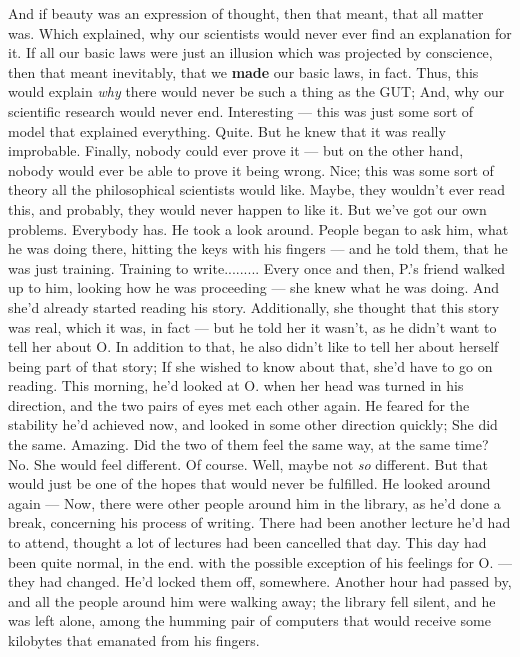 And if beauty was an expression of thought, then that meant, that all matter was. 
Which explained, why our scientists would never ever find an explanation for it. 
If all our basic laws were just an illusion which was projected by conscience, then that meant inevitably, that we \textbf{made} our basic laws, in fact. Thus, this would explain \emph{why} there would never be such a thing as the GUT; And, why our scientific research would never end. 
Interesting --- this was just some sort of model that explained everything. Quite. 
But he knew that it was really improbable. 
Finally, nobody could ever prove it --- but on the other hand, nobody would ever be able to prove it being wrong. 
Nice; this was some sort of theory all the philosophical scientists would like. 
Maybe, they wouldn't ever read this, and probably, they would never happen to like it. 
But we've got our own problems. Everybody has. 
He took a look around. People began to ask him, what he was doing there, hitting the keys with his fingers --- and he told them, that he was just training. 
Training to write.........
Every once and then, P.'s friend walked up to him, looking how he was proceeding --- she knew what he was doing. 
And she'd already started reading his story. 
Additionally, she thought that this story was real, which it was, in fact --- but he told her it wasn't, as he didn't want to tell her about O. In addition to that, he also didn't like to tell her about herself being part of that story; If she wished to know about that, she'd have to go on reading. 
This morning, he'd looked at O. when her head was turned in his direction, and the two pairs of eyes met each other again. 
He feared for the stability he'd achieved now, and looked in some other direction quickly; She did the same. 
Amazing. 
Did the two of them feel the same way, at the same time?
No. 
She would feel different. 
Of course. 
Well, maybe not \emph{so} different. 
But that would just be one of the hopes that would never be fulfilled. 
He looked around again --- Now, there were other people around him in the library, as he'd done a break, concerning his process of writing. There had been another lecture he'd had to attend, thought a lot of lectures had been cancelled that day. 
This day had been quite normal, in the end. with the possible exception of his feelings for O. --- they had changed. 
He'd locked them off, somewhere. 
Another hour had passed by, and all the people around him were walking away; the library fell silent, and he was left alone, among the humming pair of computers that would receive some kilobytes that emanated from his fingers. 
